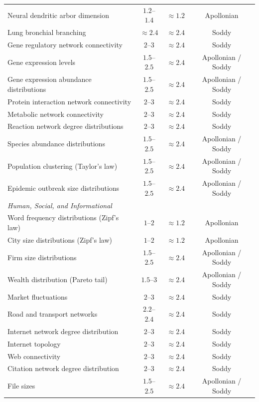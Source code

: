 \documentclass[11pt,a4paper]{article}
\begin{document}
\begin{longtable}{p{6.8cm}ccc}
      Neural dendritic arbor dimension & $1.2$--$1.4$ & $\approx 1.2$ & Apollonian \\
      Lung bronchial branching & $\approx 2.4$ & $\approx 2.4$ & Soddy \\
      Gene regulatory network connectivity & $2$--$3$ & $\approx 2.4$ & Soddy \\
      Gene expression levels & $1.5$--$2.5$ & $\approx 2.4$ & Apollonian / Soddy \\
      Gene expression abundance distributions & $1.5$--$2.5$ & $\approx 2.4$ & Apollonian / Soddy \\
      Protein interaction network connectivity & $2$--$3$ & $\approx 2.4$ & Soddy \\
      Metabolic network connectivity & $2$--$3$ & $\approx 2.4$ & Soddy \\
      Reaction network degree distributions & $2$--$3$ & $\approx 2.4$ & Soddy \\
      Species abundance distributions & $1.5$--$2.5$ & $\approx 2.4$ & Apollonian / Soddy \\
      Population clustering (Taylor's law) & $1.5$--$2.5$ & $\approx 2.4$ & Apollonian / Soddy \\
      Epidemic outbreak size distributions & $1.5$--$2.5$ & $\approx 2.4$ & Apollonian / Soddy \\
      \midrule
      \multicolumn{4}{l}{\textit{Human, Social, and Informational}} \\
      \midrule
      Word frequency distributions (Zipf's law) & $1$--$2$ & $\approx 1.2$ & Apollonian \\
      City size distributions (Zipf's law) & $1$--$2$ & $\approx 1.2$ & Apollonian \\
      Firm size distributions & $1.5$--$2.5$ & $\approx 2.4$ & Apollonian / Soddy \\
      Wealth distribution (Pareto tail) & $1.5$--$3$ & $\approx 2.4$ & Apollonian / Soddy \\
      Market fluctuations & $2$--$3$ & $\approx 2.4$ & Soddy \\
      Road and transport networks & $2.2$--$2.4$ & $\approx 2.4$ & Soddy \\
      Internet network degree distribution & $2$--$3$ & $\approx 2.4$ & Soddy \\
      Internet topology & $2$--$3$ & $\approx 2.4$ & Soddy \\
      Web connectivity & $2$--$3$ & $\approx 2.4$ & Soddy \\
      Citation network degree distribution & $2$--$3$ & $\approx 2.4$ & Soddy \\
      File sizes & $1.5$--$2.5$ & $\approx 2.4$ & Apollonian / Soddy \\
      \bottomrule
      \end{longtable}
\end{document}
